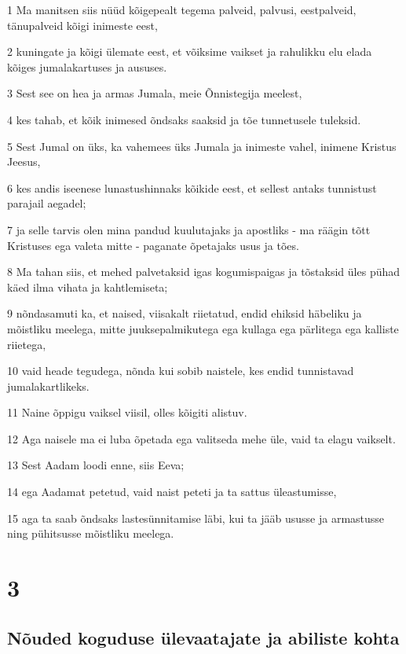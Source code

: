 \par 1 Ma manitsen siis nüüd kõigepealt tegema palveid, palvusi, eestpalveid, tänupalveid kõigi inimeste eest,
\par 2 kuningate ja kõigi ülemate eest, et võiksime vaikset ja rahulikku elu elada kõiges jumalakartuses ja aususes.
\par 3 Sest see on hea ja armas Jumala, meie Õnnistegija meelest,
\par 4 kes tahab, et kõik inimesed õndsaks saaksid ja tõe tunnetusele tuleksid.
\par 5 Sest Jumal on üks, ka vahemees üks Jumala ja inimeste vahel, inimene Kristus Jeesus,
\par 6 kes andis iseenese lunastushinnaks kõikide eest, et sellest antaks tunnistust parajail aegadel;
\par 7 ja selle tarvis olen mina pandud kuulutajaks ja apostliks - ma räägin tõtt Kristuses ega valeta mitte - paganate õpetajaks usus ja tões.
\par 8 Ma tahan siis, et mehed palvetaksid igas kogumispaigas ja tõstaksid üles pühad käed ilma vihata ja kahtlemiseta;
\par 9 nõndasamuti ka, et naised, viisakalt riietatud, endid ehiksid häbeliku ja mõistliku meelega, mitte juuksepalmikutega ega kullaga ega pärlitega ega kalliste riietega,
\par 10 vaid heade tegudega, nõnda kui sobib naistele, kes endid tunnistavad jumalakartlikeks.
\par 11 Naine õppigu vaiksel viisil, olles kõigiti alistuv.
\par 12 Aga naisele ma ei luba õpetada ega valitseda mehe üle, vaid ta elagu vaikselt.
\par 13 Sest Aadam loodi enne, siis Eeva;
\par 14 ega Aadamat petetud, vaid naist peteti ja ta sattus üleastumisse,
\par 15 aga ta saab õndsaks lastesünnitamise läbi, kui ta jääb ususse ja armastusse ning pühitsusse mõistliku meelega.


\chapter{3}

\section*{Nõuded koguduse ülevaatajate ja abiliste kohta}

